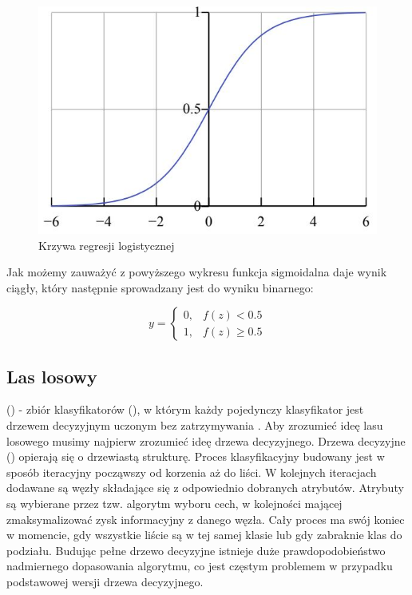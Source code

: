 \begin{figure}[h] 
        \centering\includegraphics[width=15cm]{figures/sigmoidFunc.JPG}
        \caption{Krzywa regresji logistycznej \cite{MGrzyb}}
\end{figure}

\newpage

Jak możemy zauważyć z powyższego wykresu funkcja sigmoidalna daje wynik ciągły, który następnie sprowadzany jest do wyniku binarnego:

\[
y = 
    \begin{cases}
            0,& f(z) < 0.5\\
            1,& f(z) \ge 0.5
    \end{cases}
\]

\newpage
\subsection{Las losowy}
 () - zbiór klasyfikatorów (), w którym każdy pojedynczy klasyfikator jest drzewem decyzyjnym uczonym bez zatrzymywania \cite{PPlonski}. Aby zrozumieć ideę lasu losowego musimy najpierw zrozumieć ideę drzewa decyzyjnego. Drzewa decyzyjne () opierają się o drzewiastą strukturę. Proces klasyfikacyjny budowany jest w sposób iteracyjny począwszy od korzenia aż do liści. W kolejnych iteracjach dodawane są węzły składające się z odpowiednio dobranych atrybutów. Atrybuty są wybierane przez tzw. algorytm wyboru cech, w kolejności mającej zmaksymalizować zysk informacyjny z danego węzła. Cały proces ma swój koniec w momencie, gdy wszystkie liście są w tej samej klasie lub gdy zabraknie klas do podziału. Budując pełne drzewo decyzyjne istnieje duże prawdopodobieństwo nadmiernego dopasowania algorytmu, co jest częstym problemem w przypadku podstawowej wersji drzewa decyzyjnego. \cite{MGrzyb}\\

